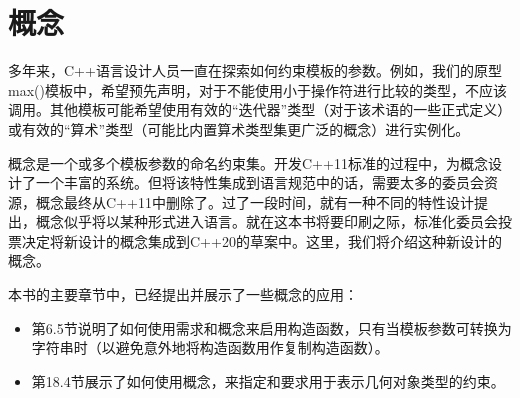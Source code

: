 \chapter{概念}
多年来，C++语言设计人员一直在探索如何约束模板的参数。例如，我们的原型max()模板中，希望预先声明，对于不能使用小于操作符进行比较的类型，不应该调用。其他模板可能希望使用有效的“迭代器”类型（对于该术语的一些正式定义）或有效的“算术”类型（可能比内置算术类型集更广泛的概念）进行实例化。

概念是一个或多个模板参数的命名约束集。开发C++11标准的过程中，为概念设计了一个丰富的系统。但将该特性集成到语言规范中的话，需要太多的委员会资源，概念最终从C++11中删除了。过了一段时间，就有一种不同的特性设计提出，概念似乎将以某种形式进入语言。就在这本书将要印刷之际，标准化委员会投票决定将新设计的概念集成到C++20的草案中。这里，我们将介绍这种新设计的概念。

本书的主要章节中，已经提出并展示了一些概念的应用：

\begin{itemize}
\item 
第6.5节说明了如何使用需求和概念来启用构造函数，只有当模板参数可转换为字符串时（以避免意外地将构造函数用作复制构造函数）。

\item 
第18.4节展示了如何使用概念，来指定和要求用于表示几何对象类型的约束。
\end{itemize}



